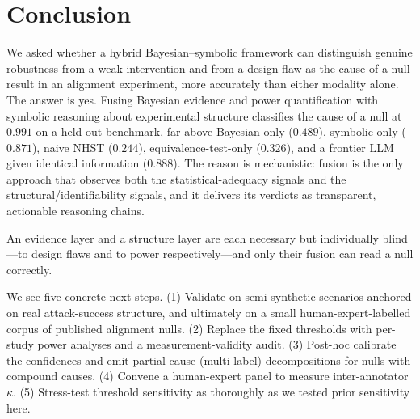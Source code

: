 \section{Conclusion}
\label{sec:conclusion}

We asked whether a hybrid Bayesian--symbolic framework can distinguish genuine
robustness from a weak intervention and from a design flaw as the cause of a null
result in an alignment experiment, more accurately than either modality alone. The
answer is yes. Fusing Bayesian evidence and power quantification with symbolic
reasoning about experimental structure classifies the cause of a null at
\macrofone $0.991$ on a held-out benchmark, far above Bayesian-only ($0.489$),
symbolic-only ($0.871$), naive NHST ($0.244$), equivalence-test-only ($0.326$), and
a frontier LLM given identical information ($0.888$). The reason is mechanistic:
fusion is the only approach that observes both the statistical-adequacy signals and
the structural/identifiability signals, and it delivers its verdicts as transparent,
actionable reasoning chains.

 An evidence layer and a structure layer are each necessary but
individually blind---to design flaws and to power respectively---and only their
fusion can read a null correctly.

 We see five concrete next steps. (1) Validate on semi-synthetic
scenarios anchored on real \harmbench{} attack-success structure, and ultimately on
a small human-expert-labelled corpus of published alignment nulls. (2) Replace the
fixed thresholds with per-study power analyses and a measurement-validity audit.
(3) Post-hoc calibrate the confidences and emit partial-cause (multi-label)
decompositions for nulls with compound causes. (4) Convene a human-expert panel to
measure inter-annotator $\kappa$. (5) Stress-test threshold sensitivity as
thoroughly as we tested prior sensitivity here.
